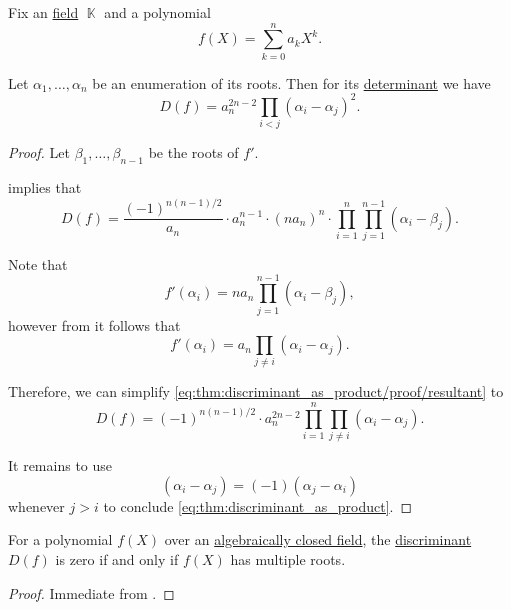 \begin{proposition}\label{thm:discriminant_as_product}
  Fix an \hyperref[def:algebraically_closed_field]{} \hyperref[def:field]{field} \( \BbbK \) and a polynomial
  \begin{equation*}
    f(X) = \sum_{k=0}^n a_k X^k.
  \end{equation*}

  Let \( \alpha_1, \ldots, \alpha_n \) be an enumeration of its roots. Then for its \hyperref[def:matrix_determinant]{determinant} we have
  \begin{equation}\label{eq:thm:discriminant_as_product}
    D(f) = a_n^{2n - 2} \prod_{i < j} (\alpha_i - \alpha_j)^2.
  \end{equation}
\end{proposition}
\begin{proof}
  Let \( \beta_1, \ldots, \beta_{n-1} \) be the roots of \( f' \).

   implies that
  \begin{equation}\label{eq:thm:discriminant_as_product/proof/resultant}
    D(f) = \frac {(-1)^{n(n-1)/2}} {a_n} \cdot a_n^{n-1} \cdot (n a_n)^n \cdot \prod_{i=1}^n \prod_{j=1}^{n-1} (\alpha_i - \beta_j).
  \end{equation}

  Note that
  \begin{equation*}
    f'(\alpha_i) = n a_n \prod_{j=1}^{n-1} (\alpha_i - \beta_j),
  \end{equation*}
  however from  it follows that
  \begin{equation*}
    f'(\alpha_i) = a_n \prod_{j \neq i} (\alpha_i - \alpha_j).
  \end{equation*}

  Therefore, we can simplify \eqref{eq:thm:discriminant_as_product/proof/resultant} to
  \begin{equation*}
    D(f) = (-1)^{n(n-1)/2} \cdot a_n^{2n-2} \prod_{i=1}^n \prod_{j \neq i} (\alpha_i - \alpha_j).
  \end{equation*}

  It remains to use
  \begin{equation*}
    (\alpha_i - \alpha_j) = (-1)(\alpha_j - \alpha_i)
  \end{equation*}
  whenever \( j > i \) to conclude \eqref{eq:thm:discriminant_as_product}.
\end{proof}

\begin{corollary}\label{thm:discriminant_invertibility}
  For a polynomial \( f(X) \) over an \hyperref[def:algebraically_closed_field]{algebraically closed field}, the \hyperref[def:discriminant]{discriminant} \( D(f) \) is zero if and only if \( f(X) \) has multiple roots.
\end{corollary}
\begin{proof}
  Immediate from .
\end{proof}

